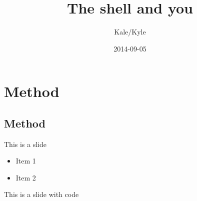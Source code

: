 \documentclass[xcolor=x11names,compress,aspectratio=43]{beamer}
\title[] %
{The shell and you}
\author[Kyle] %
{Kale/Kyle}
\date[] %
{2014-09-05}
\renewcommand{\(}{\begin{columns}}
\renewcommand{\)}{\end{columns}}
\newcommand{\<}[1]{\begin{column}{#1}}
\renewcommand{\>}{\end{column}}
\begin{document}


\contourlength{2pt} %

\begin{frame}
 \titlepage
\end{frame}


\section{Method}
\subsection{Method}

\begin{frame}{This is a slide}
  \begin{itemize}
  \item Item 1
  \item Item 2
  \end{itemize}
\end{frame}

\begin{frame}{This is a slide with code}
  \inputminted{bash}{example-script.sh} 
\end{frame}
\end{document}
